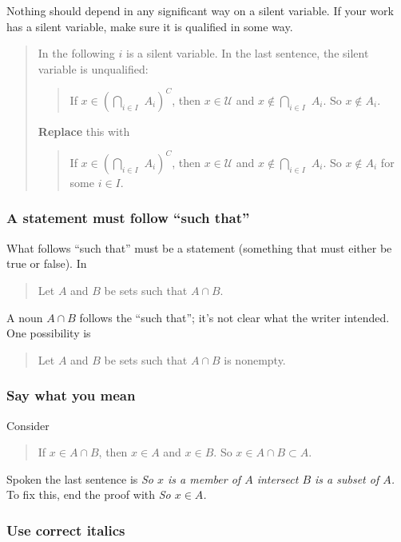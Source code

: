 \documentclass[12pt,fleqn]{article}
\newcounter{ex}\setcounter{ex}{0}
\newcounter{id}\setcounter{id}{0}
\newcounter{se}\setcounter{se}{0}
\begin{document}
Nothing should depend in any significant way on a  silent variable. If your
work has a  silent variable, make sure it is qualified in some way.


\begin{quote}
In the following \(i\) is a  silent variable. In the last sentence, the
 silent variable is unqualified:
\begin{quote}
If \(x \in \left(\underset{i \in I}{\bigcap} \,\, A_i \right)^C\), then
\(x \in \mathcal{U}\) and \(x \notin \underset{i \in I}{\bigcap} \,\, A_i\).
So \(x \notin A_i\).
\end{quote}
\textbf{Replace} this with
\begin{quote}
If \(x \in \left(\underset{i \in I}{\bigcap} \,\, A_i \right)^C\), then
\(x \in \mathcal{U}\) and \(x \notin \underset{i \in I}{\bigcap} \,\, A_i\).
So \(x \notin A_i\) for some \(i \in I\).
\end{quote}
\end{quote}

 \subsubsection{ A statement must follow ``such that''}

What follows ``such that'' must be a statement (something that must either
be true or false).  In 

\begin{quote}
Let \(A\) and \(B\) be sets such that \(A \cap B\).
\end{quote}
A noun \(A \cap B\) follows the ``such that''; it's not clear what the writer intended.
One possibility is 
\begin{quote}
Let \(A\) and \(B\) be sets such that \(A \cap B\) is nonempty.
\end{quote}

 \subsubsection{ Say what you mean}

Consider
\begin{quote}
If \(x \in A \cap B\), then \(x \in A\) and \(x \in B\). So
\(x \in A \cap B \subset A\).
\end{quote}
Spoken the last sentence is 
 \emph{So \(x\) is a member of \(A\) intersect \(B\) is a subset of \(A\).} To fix this,
end the proof with \emph{So \(x \in A\).}


 \subsubsection{Use correct italics}
 
\end{document}
